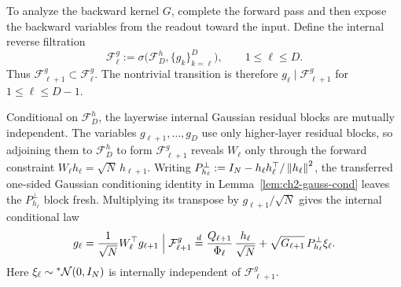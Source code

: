 To analyze the backward kernel $G$, complete the forward pass and then expose the backward variables from the readout toward the input. Define the internal reverse filtration
\begin{equation}
\label{eq:ch6-rev-filtration}
\mathcal{F}_\ell^g := \sigma\bigl(\mathcal{F}_D^h, \{g_k\}_{k=\ell}^D\bigr), \qquad 1 \le \ell \le D.
\end{equation}
Thus $\mathcal{F}_{\ell+1}^g \subset \mathcal{F}_\ell^g$. The nontrivial transition is therefore $g_\ell \mid \mathcal{F}_{\ell+1}^g$ for $1 \le \ell \le D - 1$.

Conditional on $\mathcal{F}_D^h$, the layerwise internal Gaussian residual blocks are mutually independent. The variables $g_{\ell+1}, \dots, g_D$ use only higher-layer residual blocks, so adjoining them to $\mathcal{F}_D^h$ to form $\mathcal{F}_{\ell+1}^g$ reveals $W_\ell$ only through the forward constraint $W_\ell h_\ell = \sqrt{N}\,h_{\ell+1}$. Writing $P_{h_\ell}^\perp := I_N - h_\ell h_\ell^\top / \left\lVert h_\ell \right\rVert^2$, the transferred one-sided Gaussian conditioning identity in Lemma~\ref{lem:ch2-gauss-cond}
leaves the $P_{h_\ell}^\perp$ block fresh. Multiplying its transpose by $g_{\ell+1}/\sqrt{N}$ gives the internal conditional law
\begin{equation}
\label{eq:ch6-g-cond-law}
g_\ell = \frac{1}{\sqrt{N}} W_\ell^\top g_{\ell+1} \;\Big|\; \mathcal{F}_{\ell+1}^g
\stackrel{d}{=} \frac{Q_{\ell+1}}{\Phi_\ell}\,\frac{h_\ell}{\sqrt{N}} + \sqrt{G_{\ell+1}}\,P_{h_\ell}^\perp \xi_\ell.
\end{equation}
Here $\xi_\ell \sim {}^*\mathcal{N}(0, I_N)$ is internally independent of $\mathcal{F}_{\ell+1}^g$.

